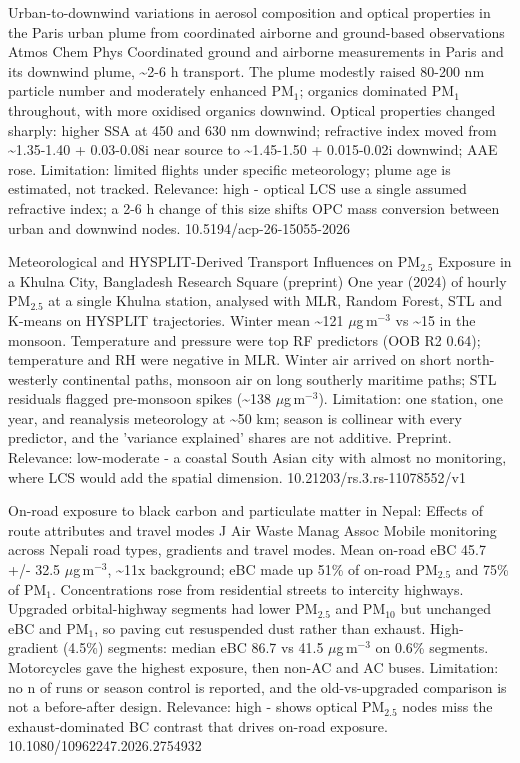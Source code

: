 \documentclass[10pt]{article}
\begin{document}
{Urban-to-downwind variations in aerosol composition and optical properties in the Paris urban plume from coordinated airborne and ground-based observations}
{Atmos Chem Phys}
{Coordinated ground and airborne measurements in Paris and its downwind plume, \textasciitilde{}2-6 h transport. The plume modestly raised 80-200 nm particle number and moderately enhanced PM$_{1}$; organics dominated PM$_{1}$ throughout, with more oxidised organics downwind. Optical properties changed sharply: higher SSA at 450 and 630 nm downwind; refractive index moved from \textasciitilde{}1.35-1.40 + 0.03-0.08i near source to \textasciitilde{}1.45-1.50 + 0.015-0.02i downwind; AAE rose. Limitation: limited flights under specific meteorology; plume age is estimated, not tracked. Relevance: high - optical LCS use a single assumed refractive index; a 2-6 h change of this size shifts OPC mass conversion between urban and downwind nodes.}
{10.5194/acp-26-15055-2026}

{Meteorological and HYSPLIT-Derived Transport Influences on PM$_{2.5}$ Exposure in a Khulna City, Bangladesh}
{Research Square (preprint)}
{One year (2024) of hourly PM$_{2.5}$ at a single Khulna station, analysed with MLR, Random Forest, STL and K-means on HYSPLIT trajectories. Winter mean \textasciitilde{}121 $\mu$g\,m$^{-3}$ vs \textasciitilde{}15 in the monsoon. Temperature and pressure were top RF predictors (OOB R2 0.64); temperature and RH were negative in MLR. Winter air arrived on short north-westerly continental paths, monsoon air on long southerly maritime paths; STL residuals flagged pre-monsoon spikes (\textasciitilde{}138 $\mu$g\,m$^{-3}$). Limitation: one station, one year, and reanalysis meteorology at \textasciitilde{}50 km; season is collinear with every predictor, and the 'variance explained' shares are not additive. Preprint. Relevance: low-moderate - a coastal South Asian city with almost no monitoring, where LCS would add the spatial dimension.}
{10.21203/rs.3.rs-11078552/v1}

{On-road exposure to black carbon and particulate matter in Nepal: Effects of route attributes and travel modes}
{J Air Waste Manag Assoc}
{Mobile monitoring across Nepali road types, gradients and travel modes. Mean on-road eBC 45.7 +/- 32.5 $\mu$g\,m$^{-3}$, \textasciitilde{}11x background; eBC made up 51\% of on-road PM$_{2.5}$ and 75\% of PM$_{1}$. Concentrations rose from residential streets to intercity highways. Upgraded orbital-highway segments had lower PM$_{2.5}$ and PM$_{10}$ but unchanged eBC and PM$_{1}$, so paving cut resuspended dust rather than exhaust. High-gradient (4.5\%) segments: median eBC 86.7 vs 41.5 $\mu$g\,m$^{-3}$ on 0.6\% segments. Motorcycles gave the highest exposure, then non-AC and AC buses. Limitation: no n of runs or season control is reported, and the old-vs-upgraded comparison is not a before-after design. Relevance: high - shows optical PM$_{2.5}$ nodes miss the exhaust-dominated BC contrast that drives on-road exposure.}
{10.1080/10962247.2026.2754932}
\end{document}
